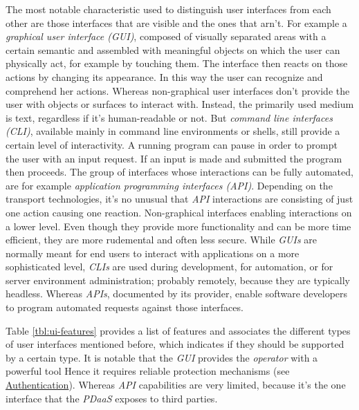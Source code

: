 \documentclass[12pt,english,a4paper,titlepage,cleardoublepage=empty,dottedtoc]{report}
\begin{document}
The most notable characteristic used to distinguish user interfaces from
each other are those interfaces that are visible and the ones that
arn't. For example a \emph{graphical user interface (GUI)}, composed of
visually separated areas with a certain semantic and assembled with
meaningful objects on which the user can physically act, for example by
touching them. The interface then reacts on those actions by changing
its appearance. In this way the user can recognize and comprehend her
actions. Whereas non-graphical user interfaces don't provide the user
with objects or surfaces to interact with. Instead, the primarily used
medium is text, regardless if it's human-readable or not. But
\emph{command line interfaces (CLI)}, available mainly in command line
environments or shells, still provide a certain level of interactivity.
A running program can pause in order to prompt the user with an input
request. If an input is made and submitted the program then proceeds.
The group of interfaces whose interactions can be fully automated, are
for example \emph{application programming interfaces (API)}. Depending
on the transport technologies, it's no unusual that \emph{API}
interactions are consisting of just one action causing one reaction.
Non-graphical interfaces enabling interactions on a lower level. Even
though they provide more functionality and can be more time efficient,
they are more rudemental and often less secure. While \emph{GUIs} are
normally meant for end users to interact with applications on a more
sophisticated level, \emph{CLIs} are used during development, for
automation, or for server environment administration; probably remotely,
because they are typically headless. Whereas \emph{APIs}, documented by
its provider, enable software developers to program automated requests
against those interfaces.

Table \ref{tbl:ui-features} provides a list of features and associates
the different types of user interfaces mentioned before, which indicates
if they should be supported by a certain type. It is notable that the
\emph{GUI} provides the \emph{operator} with a powerful tool Hence it
requires reliable protection mechanisms (see
\protect\hyperlink{authentication}{Authentication}). Whereas \emph{API}
capabilities are very limited, because it's the one interface that the
\emph{PDaaS} exposes to third parties.
\end{document}
